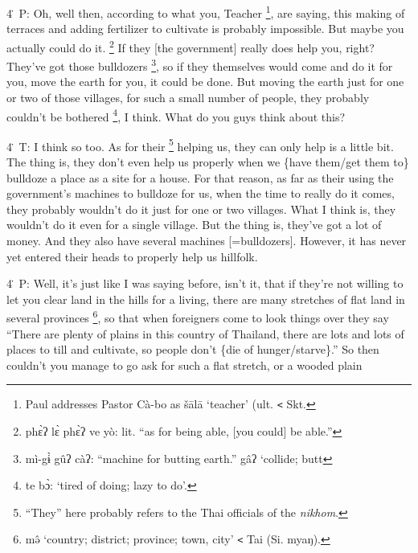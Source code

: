 4\. P: Oh, well then, according to what you, Teacher \footnote{Paul addresses Pastor Cà-bo as šālā `teacher' (ult. \texttt{<} Skt.}, are saying, this making
of terraces and adding fertilizer to cultivate is probably impossible. But maybe
you actually could do it. \footnote{phɛ̀ʔ lɛ̀ phɛ̀ʔ ve yò: lit. ``as for being able, [you could] be able.''} If they [the government] really does help you, right?
They've got those bulldozers \footnote{mì-gɨ̀ gûʔ càʔ: ``machine for butting earth.'' gâʔ `collide; butt}, so if they themselves would come and do it for
you, move the earth for you, it could be done. But moving the earth just for one
or two of those villages, for such a small number of people, they probably couldn't
be bothered \footnote{te bɔ̀: `tired of doing; lazy to do'.}, I think. What do you guys think about this?

4\. T: I think so too. As for their \footnote{``They'' here probably refers to the Thai officials of the \textit{nikhom}.} helping us, they can only help is a little
bit. The thing is, they don't even help us properly when we \{have them/get them
to\} bulldoze a place as a site for a house. For that reason, as far as their using
the government's machines to bulldoze for us, when the time to really do it comes,
they probably wouldn't do it just for one or two villages. What I think is, they
wouldn't do it even for a single village. But the thing is, they've got a lot of
money. And they also have several machines [=bulldozers]. However, it has never
yet entered their heads to properly help us hillfolk.

4\. P: Well, it's just like I was saying before, isn't it, that if they're not
willing to let you clear land in the hills for a living, there are many stretches
of flat land in several provinces \footnote{mə̂ `country; district; province; town, city' \texttt{<} Tai (Si. myaŋ).}, so that when foreigners come to look things
over they say ``There are plenty of plains in this country of Thailand, there are
lots and lots of places to till and cultivate, so people don't \{die of hunger/starve\}.''
So then couldn't you manage to go ask for such a flat stretch, or a wooded plain
